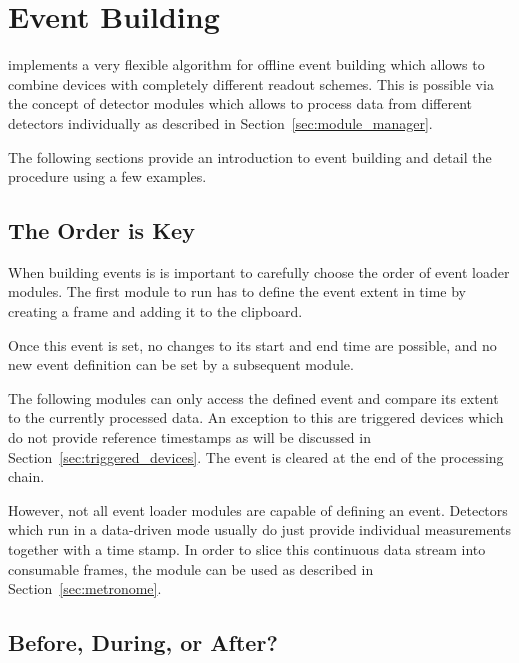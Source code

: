 \chapter{Event Building}
\label{ch:events}

\corry implements a very flexible algorithm for offline event building which allows to combine devices with completely different readout schemes.
This is possible via the concept of detector modules which allows to process data from different detectors individually as described in Section~\ref{sec:module_manager}.

The following sections provide an introduction to event building and detail the procedure using a few examples.

\section{The Order is Key}

When building events is is important to carefully choose the order of event loader modules.
The first module to run has to define the event extent in time by creating a frame and adding it to the clipboard.

\begin{warning}
Once this event is set, no changes to its start and end time are possible, and no new event definition can be set by a subsequent module.
\end{warning}

The following modules can only access the defined event and compare its extent to the currently processed data.
An exception to this are triggered devices which do not provide reference timestamps as will be discussed in Section~\ref{sec:triggered_devices}.
The event is cleared at the end of the processing chain.

However, not all event loader modules are capable of defining an event.
Detectors which run in a data-driven mode usually do just provide individual measurements together with a time stamp.
In order to slice this continuous data stream into consumable frames, the  module can be used as described in Section~\ref{sec:metronome}.

\section{Before, During, or After?}

